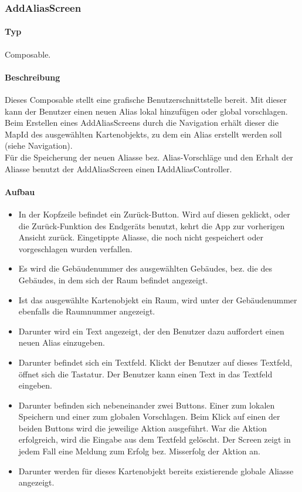 \subsubsection{AddAliasScreen}
\paragraph*{Typ}
Composable.
\paragraph*{Beschreibung}
Dieses Composable stellt eine grafische Benutzerschnittstelle bereit.
Mit dieser kann der Benutzer einen neuen Alias lokal hinzufügen oder global vorschlagen.\\
Beim Erstellen eines AddAliasScreens durch die Navigation erhält dieser die MapId 
des ausgewählten Kartenobjekts, zu dem ein Alias erstellt werden soll (siehe Navigation).\\
Für die Speicherung der neuen Aliasse bez. Alias-Vorschläge und den Erhalt der Aliasse benutzt 
der AddAliasScreen einen IAddAliasController.

\paragraph*{Aufbau}
\begin{itemize}
    \item In der Kopfzeile befindet ein Zurück-Button. Wird auf diesen geklickt, oder die Zurück-Funktion des Endgeräts benutzt, 
    kehrt die App zur vorherigen Ansicht zurück. Eingetippte Aliasse, die noch nicht gespeichert oder vorgeschlagen wurden verfallen.
    \item Es wird die Gebäudenummer des ausgewählten Gebäudes, bez. die des Gebäudes, in dem sich der Raum befindet angezeigt.
    \item Ist das ausgewählte Kartenobjekt ein Raum, wird unter der Gebäudenummer ebenfalls die Raumnummer angezeigt.
    \item Darunter wird ein Text angezeigt, der den Benutzer dazu auffordert einen neuen Alias einzugeben.
    \item Darunter befindet sich ein Textfeld. Klickt der Benutzer auf dieses Textfeld, öffnet sich die Tastatur. 
    Der Benutzer kann einen Text in das Textfeld eingeben.
    \item Darunter befinden sich nebeneinander zwei Buttons. Einer zum lokalen Speichern und einer zum globalen Vorschlagen. 
    Beim Klick auf einen der beiden Buttons wird die jeweilige Aktion ausgeführt. War die Aktion erfolgreich, wird die Eingabe 
    aus dem Textfeld gelöscht. Der Screen zeigt in jedem Fall eine Meldung zum Erfolg bez. Misserfolg der Aktion an.
    \item Darunter werden für dieses Kartenobjekt bereits existierende globale Aliasse angezeigt.
\end{itemize}
